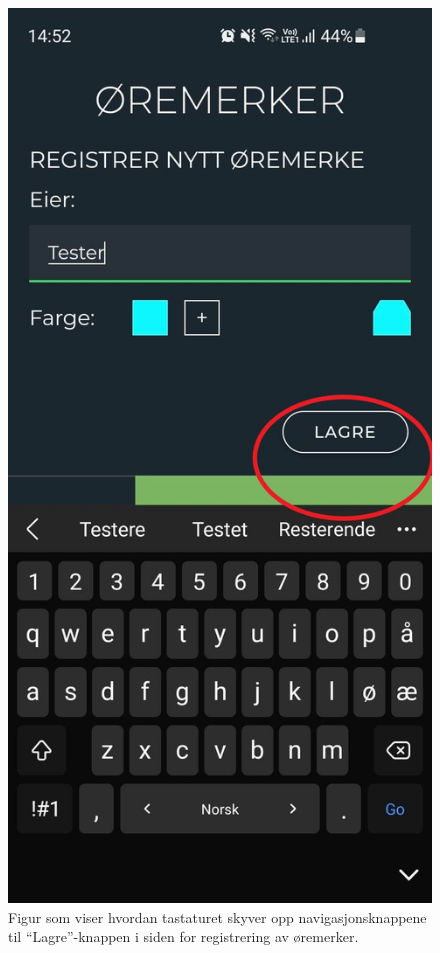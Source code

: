 \begin{figure}[H]
\centering
\captionsetup{width=.8\linewidth}
\includegraphics[scale=0.3]{Figurer/skjermbilder/oremerke_feil.jpg}
\caption{Figur som viser hvordan tastaturet skyver opp navigasjonsknappene til \enquote{Lagre}-knappen i siden for registrering av øremerker.}
\label{fig:oremerke_feil}
\end{figure}

